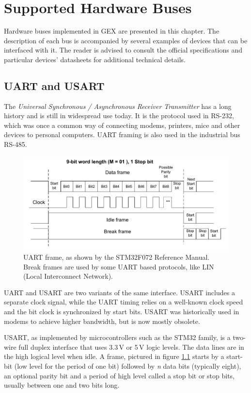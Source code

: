 \chapter{Supported Hardware Buses} \label{ch:hw_buses}

Hardware buses implemented in GEX are presented in this chapter. The description of each bus is accompanied by several examples of devices that can be interfaced with it. The reader is advised to consult the official specifications and particular devices' datasheets for additional technical details.

\section{UART and USART}

The \textit{Universal Synchronous / Asynchronous Receiver Transmitter} has a long history and is still in widespread use today. It is the protocol used in RS-232, which was once a common way of connecting modems, printers, mice and other devices to personal computers. UART framing is also used in the industrial bus RS-485.

\begin{figure}
	\centering
	\includegraphics[width=.8\textwidth] {img/usart.png}
	\caption[UART frame structure]{\label{fig:uart-frame}UART frame, as shown by the STM32F072 Reference Manual. Break frames are used by some UART based protocols, like LIN (Local Interconnect Network).}
\end{figure}

UART and USART are two variants of the same interface. USART includes a separate clock signal, while the UART timing relies on a well-known clock speed and the bit clock is synchronized by start bits. USART was historically used in modems to achieve higher bandwidth, but is now mostly obsolete.

USART, as implemented by microcontrollers such as the STM32 family, is a two-wire full duplex interface that uses 3.3\,V or 5\,V logic levels. The data lines are in the high logical level when idle. A frame, pictured in figure \ref{fig:uart-frame} starts by a start-bit (low level for the period of one bit) followed by \textit{n} data bits (typically eight), an optional parity bit and a period of high level called a stop bit or stop bits, usually between one and two bits long.
 

